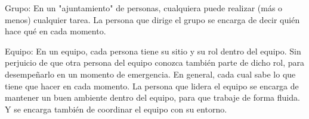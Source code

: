 Grupo:
En un "ajuntamiento" de personas, cualquiera puede realizar (más o menos) cualquier tarea.
La persona que dirige el grupo se encarga de decir quién hace qué en cada momento. 

Equipo:
En un equipo, cada persona tiene su sitio y su rol dentro del equipo. Sin perjuicio de que otra persona del equipo conozca también parte de dicho rol, para desempeñarlo en un momento de emergencia. En general, cada cual sabe lo que tiene que hacer en cada momento.
La persona que lidera el equipo se encarga de mantener un buen ambiente dentro del equipo, para que trabaje de forma fluida. Y se encarga también de coordinar el equipo con su entorno.